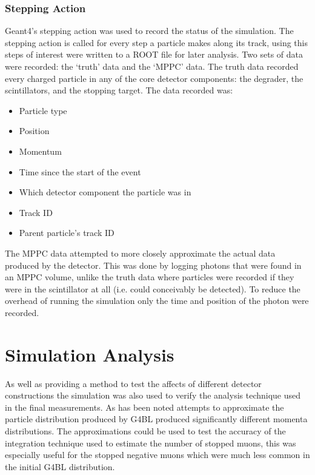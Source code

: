 \subsubsection{Stepping Action} %
\label{sub:stepping_action}
Geant4's stepping action was used to record the status of the simulation. The stepping action is called for every step a particle makes along its track, using this steps of interest were written to a ROOT file for later analysis. Two sets of data were recorded: the `truth' data and the `MPPC' data. The truth data recorded every charged particle in any of the core detector components: the degrader, the scintillators, and the stopping target. The data recorded was:
\begin{itemize}
  \item Particle type
  \item Position
  \item Momentum
  \item Time since the start of the event
  \item Which detector component the particle was in
  \item Track ID
  \item Parent particle's track ID
\end{itemize}

The MPPC data attempted to more closely approximate the actual data produced by the detector. This was done by logging photons that were found in an MPPC volume, unlike the truth data where particles were recorded if they were in the scintillator at all (i.e. could conceivably be detected). To reduce the overhead of running the simulation only the time and position of the photon were recorded.


\section{Simulation Analysis} %
\label{cha:simulation_analysis}

As well as providing a method to test the affects of different detector constructions the simulation was also used to verify the analysis technique used in the final measurements. As has been noted attempts to approximate the particle distribution produced by G4BL produced significantly different momenta distributions. The approximations could be used to test the accuracy of the integration technique used to estimate the number of stopped muons, this was especially useful for the stopped negative muons which were much less common in the initial G4BL distribution.

